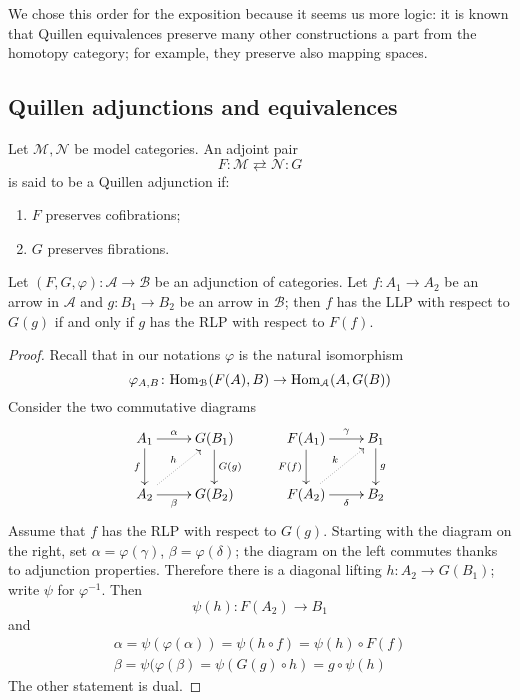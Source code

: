 \begin{refsection}
We chose this order for the exposition because it seems us more logic: it is known that Quillen equivalences preserve many other constructions a part from the homotopy category; for example, they preserve also mapping spaces.

\subsection{Quillen adjunctions and equivalences}

\begin{defin}
Let $\mathcal M, \mathcal N$ be model categories. An adjoint pair
\[
F \colon \mathcal M \rightleftarrows \mathcal N \colon G
\]
is said to be a Quillen adjunction if:
\begin{enumerate}
\item $F$ preserves cofibrations;
\item $G$ preserves fibrations.
\end{enumerate}
\end{defin}

\begin{lemma} \label{lemma adjunction and lifting properties}
Let $(F,G,\varphi) \colon \mathcal A \to \mathcal B$ be an adjunction of categories. Let $f \colon A_1 \to A_2$ be an arrow in $\mathcal A$ and $g \colon B_1 \to B_2$ be an arrow in $\mathcal B$; then $f$ has the LLP with respect to $G(g)$ if and only if $g$ has the RLP with respect to $F(f)$.
\end{lemma}

\begin{proof}
Recall that in our notations $\varphi$ is the natural isomorphism
\[
\varphi_{A,B} \colon \mathrm{Hom}_{\mathcal B}(F(A),B) \to \mathrm{Hom}_{\mathcal A}(A,G(B))
\]
Consider the two commutative diagrams
\[
\xymatrix{
A_1 \ar[d]_f \ar[r]^-\alpha & G(B_1) \ar[d]^{G(g)} \\ A_2 \ar[r]_-{\beta} \ar@{.>}[ur]^h & G(B_2)
} \qquad
\xymatrix{
F(A_1) \ar[d]_{F(f)} \ar[r]^-\gamma & B_1 \ar[d]^g \\ F(A_2) \ar@{.>}[ur]^k \ar[r]_-\delta & B_2
}
\]
Assume that $f$ has the RLP with respect to $G(g)$. Starting with the diagram on the right, set $\alpha = \varphi(\gamma)$, $\beta = \varphi(\delta)$; the diagram on the left commutes thanks to adjunction properties. Therefore there is a diagonal lifting $h \colon A_2 \to G(B_1)$; write $\psi$ for $\varphi^{-1}$. Then
\[
\psi(h) \colon F(A_2) \to B_1
\]
and
\begin{gather*}
\alpha = \psi(\varphi(\alpha)) = \psi(h \circ f) = \psi(h) \circ F(f) \\
\beta = \psi(\varphi(\beta) = \psi(G(g) \circ h) = g \circ \psi(h)
\end{gather*}
The other statement is dual.
\end{proof}


\end{refsection}
